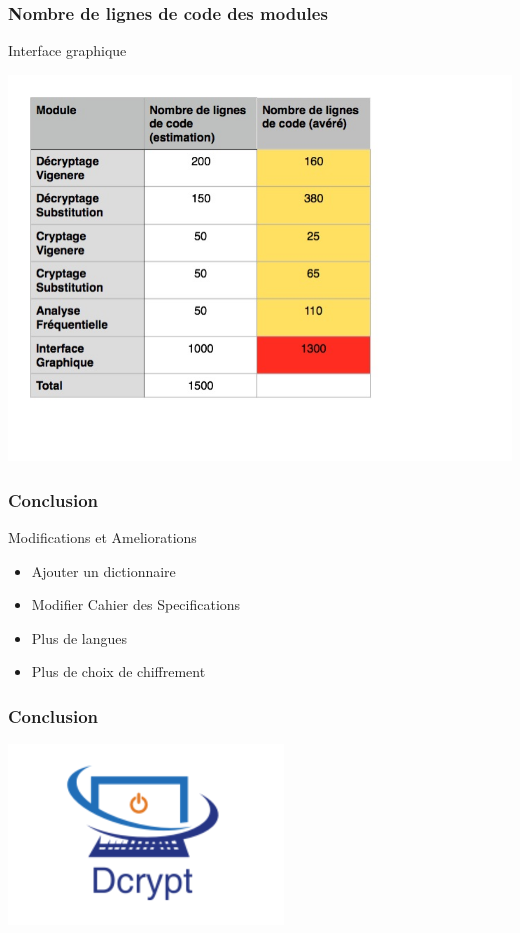 \documentclass[10pt,xcolor=table]{beamer}
\begin{document}
\begin{frame}
\frametitle{Nombre de lignes de code des modules}
\begin{block}{Interface graphique}
\begin{center}
\includegraphics[scale =0.3]{preview4.jpg} \\ 
\end{center}
\end{block}
\end{frame}

\begin{frame}
  \frametitle{Conclusion}
	\begin{block}{Modifications et Ameliorations}
	\begin{itemize} \pause
		\item Ajouter un dictionnaire\\
		\item Modifier Cahier des Specifications\\ \pause
		\item Plus de langues\\ 
		\item Plus de choix de chiffrement
	\end{itemize}
	\end{block}
\end{frame}
\begin{frame}
  \frametitle{Conclusion}
\begin{center}
\includegraphics[scale =0.5]{logo.png}
\end{center}
\end{frame}
\end{document}
